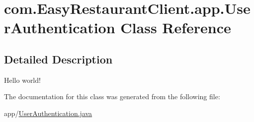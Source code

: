 \hypertarget{classcom_1_1_easy_restaurant_client_1_1app_1_1_user_authentication}{}\section{com.\+Easy\+Restaurant\+Client.\+app.\+User\+Authentication Class Reference}
\label{classcom_1_1_easy_restaurant_client_1_1app_1_1_user_authentication}


\subsection{Detailed Description}
Hello world! 

The documentation for this class was generated from the following file\+:\begin{DoxyCompactItemize}
\item 
app/\mbox{\hyperlink{_user_authentication_8java}{User\+Authentication.\+java}}\end{DoxyCompactItemize}
